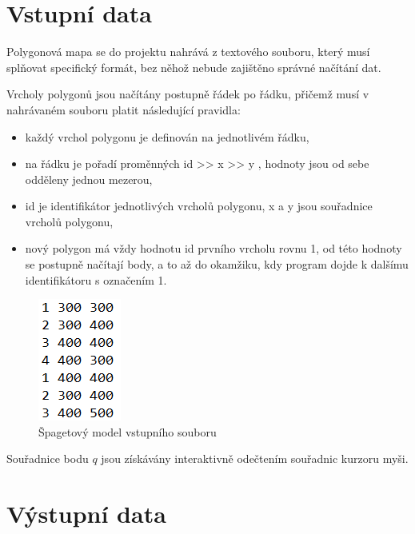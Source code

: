 \documentclass[11pt]{article}
\begin{document}
\section{Vstupní data}

Polygonová mapa se do projektu nahrává z textového souboru, který musí splňovat specifický formát, bez něhož nebude zajištěno správné načítání dat.  

Vrcholy polygonů jsou načítány postupně řádek po řádku, přičemž musí v nahrávaném souboru platit následující pravidla:    

\begin{itemize}
\item každý vrchol polygonu je definován na jednotlivém řádku,
\item na řádku je pořadí proměnných id >> x >> y   ,  hodnoty jsou od sebe odděleny  jednou mezerou,
\item id je identifikátor jednotlivých vrcholů polygonu, x a y jsou souřadnice vrcholů polygonu,    
\item nový polygon má vždy hodnotu id prvního vrcholu rovnu 1, od této hodnoty  se  postupně načítají body, a  to až do okamžiku,  kdy program dojde  k dalšímu identifikátoru s označením 1.   
\end{itemize}

\begin{figure}[htbh]
	\centering
	\includegraphics[scale=1]{images/vstup.png} 
	\caption{Špagetový model vstupního souboru}
	\label{fig:vstup.}
\end{figure} 

Souřadnice bodu $q$ jsou získávány interaktivně odečtením souřadnic kurzoru myši.   

\clearpage


\section{Výstupní data}
\end{document}
